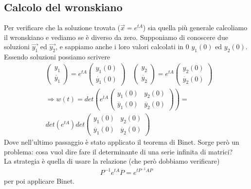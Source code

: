 \documentclass[10pt,a4paper]{article}
\begin{document}
\subsection{Calcolo del wronskiano}
Per verificare che la soluzione trovata ($\vec{x} = e^{tA}$) sia quella più generale calcoliamo il wronskiano e vediamo se è diverso da zero. Supponiamo di conoscere due soluzioni \(\vec{y_1}\) ed \( \vec{y_2} \), e sappiamo anche i loro valori calcolati in 0 \(y_1(0)\) ed \(y_2(0)\). Essendo soluzioni possiamo scrivere
\begin{align*}
	&\begin{pmatrix}
		y_1\\
		\dot{y_1}
	\end{pmatrix} = e^{tA}
	\begin{pmatrix}
		y_1(0)\\
		\dot{y_1}(0)
	\end{pmatrix} \quad 
	\begin{pmatrix}
		y_2\\
		\dot{y_2}
	\end{pmatrix} = e^{tA}
	\begin{pmatrix}
		y_2(0)\\
		\dot{y_2}(0)
	\end{pmatrix} \\
	&\Rightarrow w(t) = det
	\left(e^{tA}
	\begin{pmatrix}
		y_1(0)&y_2(0)\\
		\dot{y_1}(0)&\dot{y_2}(0)
	\end{pmatrix}
	\right)=\\
	&det(e^{tA})det
	\begin{pmatrix}
		y_1(0)&y_2(0)\\
		\dot{y_1}(0)&\dot{y_2}(0)
	\end{pmatrix}
\end{align*}
 Dove nell'ultimo passaggio è stato applicato il teorema di Binet. Sorge però un problema: cosa vuol dire fare il determinante di una serie infinita di matrici?\\
 La strategia è quella di usare la relazione (che però dobbiamo verificare)
 \begin{align*}
  P^{-1}e^{tA}P = 	e^{t P^{-1}A P}
 \end{align*}
per poi applicare Binet.
\end{document}
